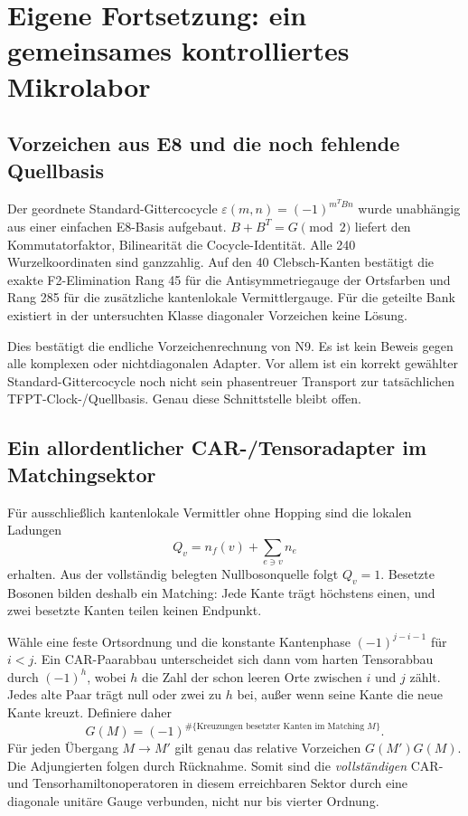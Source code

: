 \chapter{Eigene Fortsetzung: ein gemeinsames kontrolliertes Mikrolabor}
\label{ch:micro14}
\section{Vorzeichen aus E8 und die noch fehlende Quellbasis}
Der geordnete Standard-Gittercocycle $\varepsilon(m,n)=(-1)^{m^TBn}$ wurde unabhängig aus einer einfachen E8-Basis aufgebaut. $B+B^T=G\pmod2$ liefert den Kommutatorfaktor, Bilinearität die Cocycle-Identität. Alle 240 Wurzelkoordinaten sind ganzzahlig. Auf den 40 Clebsch-Kanten bestätigt die exakte F2-Elimination Rang 45 für die Antisymmetriegauge der Ortsfarben und Rang 285 für die zusätzliche kantenlokale Vermittlergauge. Für die geteilte Bank existiert in der untersuchten Klasse diagonaler Vorzeichen keine Lösung.

Dies bestätigt die endliche Vorzeichenrechnung von N9. Es ist kein Beweis gegen alle komplexen oder nichtdiagonalen Adapter. Vor allem ist ein korrekt gewählter Standard-Gittercocycle noch nicht sein phasentreuer Transport zur tatsächlichen TFPT-Clock-/Quellbasis. Genau diese Schnittstelle bleibt offen.

\section{Ein allordentlicher CAR-/Tensoradapter im Matchingsektor}
Für ausschließlich kantenlokale Vermittler ohne Hopping sind die lokalen Ladungen
\begin{equation}
Q_v=n_f(v)+\sum_{e\ni v}n_e
\end{equation}
erhalten. Aus der vollständig belegten Nullbosonquelle folgt $Q_v=1$. Besetzte Bosonen bilden deshalb ein Matching: Jede Kante trägt höchstens einen, und zwei besetzte Kanten teilen keinen Endpunkt.

Wähle eine feste Ortsordnung und die konstante Kantenphase $(-1)^{j-i-1}$ für $i<j$. Ein CAR-Paarabbau unterscheidet sich dann vom harten Tensorabbau durch $(-1)^h$, wobei $h$ die Zahl der schon leeren Orte zwischen $i$ und $j$ zählt. Jedes alte Paar trägt null oder zwei zu $h$ bei, außer wenn seine Kante die neue Kante kreuzt. Definiere daher
\begin{equation}
G(M)=(-1)^{\#\{\text{Kreuzungen besetzter Kanten im Matching }M\}}.
\end{equation}
Für jeden Übergang $M\to M'$ gilt genau das relative Vorzeichen $G(M')G(M)$. Die Adjungierten folgen durch Rücknahme. Somit sind die \emph{vollständigen} CAR- und Tensorhamiltonoperatoren in diesem erreichbaren Sektor durch eine diagonale unitäre Gauge verbunden, nicht nur bis vierter Ordnung.

